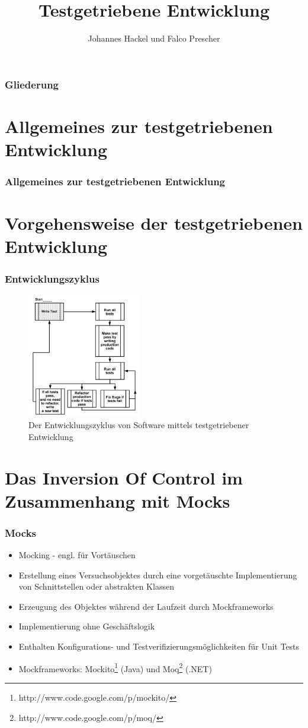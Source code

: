 \documentclass{beamer}
\author{Johannes Hackel und Falco Prescher}
\title{Testgetriebene Entwicklung}
\begin{document}
\begin{frame}
\titlepage
\end{frame}

\begin{frame}
\frametitle{Gliederung}
\tableofcontents
\end{frame}

\section{Allgemeines zur testgetriebenen Entwicklung}
\begin{frame}
\frametitle{Allgemeines zur testgetriebenen Entwicklung}
\end{frame}

\section{Vorgehensweise der testgetriebenen Entwicklung}
\begin{frame}
\frametitle{Entwicklungszyklus}
\begin{figure}[htbp]
\includegraphics[width=5cm]{zyklus.png}
\caption{Der Entwicklungszyklus von Software mittels testgetriebener Entwicklung}
\end{figure}
\end{frame}

\section{Das Inversion Of Control im Zusammenhang mit Mocks}
\begin{frame}
\frametitle{Mocks}
\begin{itemize}
\item Mocking - engl. für Vortäuschen
\item Erstellung eines Versuchsobjektes durch eine vorgetäuschte Implementierung von Schnittstellen oder abstrakten Klassen
\item Erzeugung des Objektes während der Laufzeit durch Mockframeworks
\item Implementierung ohne Geschäftslogik
\item Enthalten Konfigurations- und Testverifizierungsmöglichkeiten für Unit Tests
\item Mockframeworks: Mockito\footnote{http://www.code.google.com/p/mockito/} (Java) und Moq\footnote{http://www.code.google.com/p/moq/} (.NET)
\end{itemize}
\end{frame}
\end{document}
